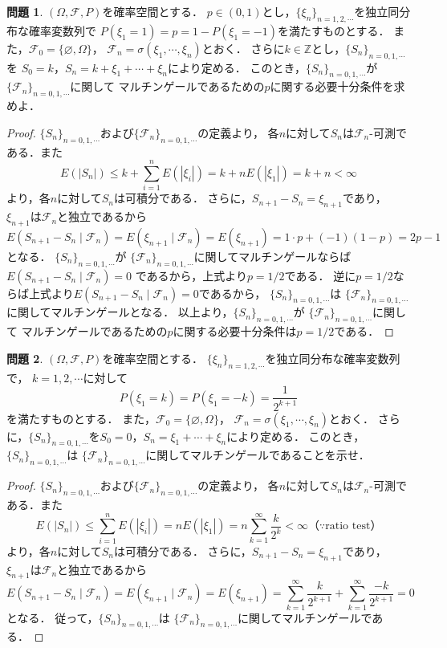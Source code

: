 \documentclass{jsarticle}
\theoremstyle{definition}
\newtheorem{qst}{問題}
\begin{document}
\begin{qst}
$(\Omega,\mathcal{F},P)$を確率空間とする．
$p\in(0,1)$とし，$\{\xi_n\}_{n=1,2,\cdots}$を独立同分布な確率変数列で
$P(\xi_1=1)=p=1-P(\xi_1=-1)$を満たすものとする．
また，$\mathcal{F}_0=\{\varnothing,\Omega\}$，
$\mathcal{F}_n=\sigma(\xi_1,\cdots,\xi_n)$とおく．
さらに$k\in\mathbb{Z}$とし，$\{S_n\}_{n=0,1,\cdots}$を
$S_0=k$，$S_n=k+\xi_1+\cdots+\xi_n$により定める．
このとき，$\{S_n\}_{n=0,1,\cdots}$が
$\{\mathcal{F}_n\}_{n=0,1,\cdots}$に関して
マルチンゲールであるための$p$に関する必要十分条件を求めよ．
\end{qst}
\begin{proof}
$\{S_n\}_{n=0,1,\cdots}$および$\{\mathcal{F}_n\}_{n=0,1,\cdots}$の定義より，
各$n$に対して$S_n$は$\mathcal{F}_n$-可測である．また
\[ E(|S_n|)\leq k+\sum_{i=1}^nE(|\xi_i|)
=k+nE(|\xi_1|)=k+n<\infty \]
より，各$n$に対して$S_n$は可積分である．
さらに，$S_{n+1}-S_n=\xi_{n+1}$であり，
$\xi_{n+1}$は$\mathcal{F}_n$と独立であるから
\[ E(S_{n+1}-S_n\mid\mathcal{F}_n)=
E(\xi_{n+1}\mid\mathcal{F}_n)=E(\xi_{n+1})
=1\cdot p+(-1)(1-p)=2p-1 \]
となる．
$\{S_n\}_{n=0,1,\cdots}$が
$\{\mathcal{F}_n\}_{n=0,1,\cdots}$に関してマルチンゲールならば
$E(S_{n+1}-S_n\mid\mathcal{F}_n)=0$
であるから，上式より$p=1/2$である．
逆に$p=1/2$ならば上式より$E(S_{n+1}-S_n\mid\mathcal{F}_n)=0$であるから，
$\{S_n\}_{n=0,1,\cdots}$は
$\{\mathcal{F}_n\}_{n=0,1,\cdots}$に関してマルチンゲールとなる．
以上より，$\{S_n\}_{n=0,1,\cdots}$が
$\{\mathcal{F}_n\}_{n=0,1,\cdots}$に関して
マルチンゲールであるための$p$に関する必要十分条件は$p=1/2$である．
\end{proof}

\begin{qst}
$(\Omega,\mathcal{F},P)$を確率空間とする．
$\{\xi_n\}_{n=1,2,\cdots}$を独立同分布な確率変数列で，
$k=1,2,\cdots$に対して
\[ P(\xi_1=k)=P(\xi_1=-k)=\frac{1}{2^{k+1}} \]
を満たすものとする．
また，$\mathcal{F}_0=\{\varnothing,\Omega\}$，
$\mathcal{F}_n=\sigma(\xi_1,\cdots,\xi_n)$とおく．
さらに，$\{S_n\}_{n=0,1,\cdots}$を$S_0=0$，$S_n=\xi_1+\cdots+\xi_n$により定める．
このとき，$\{S_n\}_{n=0,1,\cdots}$は
$\{\mathcal{F}_n\}_{n=0,1,\cdots}$に関してマルチンゲールであることを示せ．
\end{qst}
\begin{proof}
$\{S_n\}_{n=0,1,\cdots}$および$\{\mathcal{F}_n\}_{n=0,1,\cdots}$の定義より，
各$n$に対して$S_n$は$\mathcal{F}_n$-可測である．また
\[ E(|S_n|)\leq\sum_{i=1}^nE(|\xi_i|)
=nE(|\xi_1|)=n\sum_{k=1}^\infty\frac{k}{2^k}<\infty
（\because\text{ratio test}） \]
より，各$n$に対して$S_n$は可積分である．
さらに，$S_{n+1}-S_n=\xi_{n+1}$であり，
$\xi_{n+1}$は$\mathcal{F}_n$と独立であるから
\[ E(S_{n+1}-S_n\mid\mathcal{F}_n)=
E(\xi_{n+1}\mid\mathcal{F}_n)=E(\xi_{n+1})
=\sum_{k=1}^\infty\frac{k}{2^{k+1}}+\sum_{k=1}^\infty\frac{-k}{2^{k+1}}
=0 \]
となる．
従って，$\{S_n\}_{n=0,1,\cdots}$は
$\{\mathcal{F}_n\}_{n=0,1,\cdots}$に関してマルチンゲールである．
\end{proof}
\end{document}
